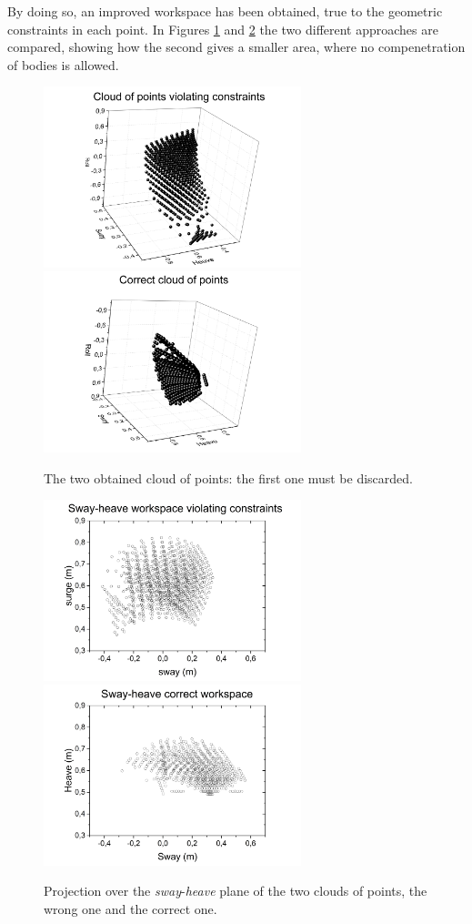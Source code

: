 \documentclass[10.5pt, twocolumn]{article}
\begin{document}
By doing so, an improved workspace has been obtained, true to the geometric constraints in each point. In Figures \ref{fig:clouds} and \ref{fig:proj_clouds} the two different approaches are compared, showing how the second gives a smaller area, where no compenetration of bodies is allowed.
\begin{figure}[h!]
	\includegraphics[width=7.5cm]{Images/CloudPoints_bad}
    \includegraphics[width=7.5cm]{Images/CloudPoints_tot}
	\caption{The two obtained cloud of points: the first one must be discarded.}
  \label{fig:clouds}
\end{figure}
\begin{figure}[h!]
	\includegraphics[width=7.5cm]{Images/ws_xy_bad}
    \includegraphics[width=7.5cm]{Images/ws_xy_tot}
	\caption{Projection over the \textit{sway}-\textit{heave} plane of the two clouds of points, the wrong one and the correct one.}
  \label{fig:proj_clouds}
\end{figure}
\end{document}
